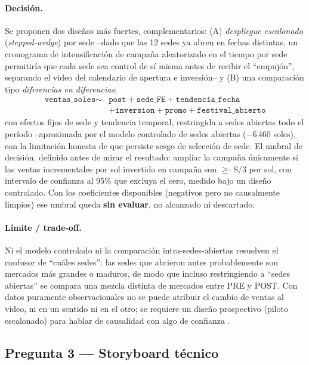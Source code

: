 \paragraph{Decisión.} Se proponen dos diseños más fuertes, complementarios: (A) \emph{despliegue escalonado} (\emph{stepped-wedge}) por sede --dado que las 12 sedes ya abren en fechas distintas, un cronograma de intensificación de campaña aleatorizado en el tiempo por sede permitiría que cada sede sea control de sí misma antes de recibir el ``empujón'', separando el video del calendario de apertura e inversión-- y (B) una comparación tipo \emph{diferencias en diferencias}:
\begin{equation*}
\begin{aligned}
\texttt{ventas\_soles} \sim{} & \texttt{post} + \texttt{sede\_FE} + \texttt{tendencia\_fecha} \\
& + \texttt{inversion} + \texttt{promo} + \texttt{festival\_abierto}
\end{aligned}
\end{equation*}
con efectos fijos de sede y tendencia temporal, restringida a sedes abiertas todo el período --aproximada por el modelo controlado de sedes abiertas ($-6\,460$ soles), con la limitación honesta de que persiste sesgo de selección de sede. El umbral de decisión, definido antes de mirar el resultado: ampliar la campaña únicamente si las ventas incrementales por sol invertido en campaña son $\geq$ S/3 por sol, con intervalo de confianza al 95\% que excluya el cero, medido bajo un diseño controlado. Con los coeficientes disponibles (negativos pero no causalmente limpios) ese umbral queda \textbf{sin evaluar}, no alcanzado ni descartado.

\paragraph{Límite / trade-off.} Ni el modelo controlado ni la comparación intra-sedes-abiertas resuelven el confusor de ``cuáles sedes'': las sedes que abrieron antes probablemente son mercados más grandes o maduros, de modo que incluso restringiendo a ``sedes abiertas'' se compara una mezcla distinta de mercados entre PRE y POST. Con datos puramente observacionales no se puede atribuir el cambio de ventas al video, ni en un sentido ni en el otro; se requiere un diseño prospectivo (piloto escalonado) para hablar de causalidad con algo de confianza \citep{simpson1951interpretation}.

\subsection{Pregunta 3 --- Storyboard técnico}\label{ssec:c5-q3}

